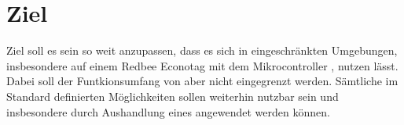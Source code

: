 \section{Ziel}
Ziel soll es sein  so weit anzupassen, dass es sich in eingeschränkten Umgebungen, insbesondere auf einem Redbee Econotag \cite{econotag} mit dem
 Mikrocontroller \cite{mc1322}, nutzen lässt. Dabei soll der Funtkionsumfang von  aber nicht eingegrenzt werden. Sämtliche im Standard
definierten Möglichkeiten sollen weiterhin nutzbar sein und insbesondere durch Aushandlung eines  angewendet werden können.